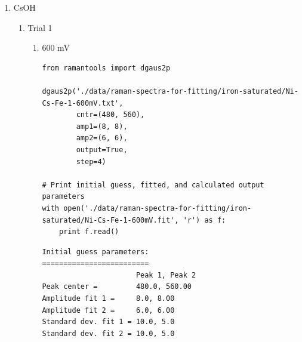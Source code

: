 \documentclass[journal=jpccck,manuscript=suppinfo,email=true]{achemso}
\begin{document}
\begin{enumerate}
\begin{enumerate}
\begin{enumerate}
\begin{verbatim}
# Print initial guess, fitted, and calculated output parameters
with open('./data/raman-spectra-for-fitting/iron-saturated/Ni-Li-Fe-3-800mV.fit', 'r') as f:
    print f.read()
\end{verbatim}

\begin{verbatim}
Initial guess parameters:
=========================
                      Peak 1, Peak 2
Peak center =         480.0, 560.00
Amplitude fit 1 =     12.0, 12.00
Amplitude fit 2 =     7.0, 7.00
Standard dev. fit 1 = 10.0, 5.0
Standard dev. fit 2 = 10.0, 5.0

Baseline parameters:
=========================
Slope =               -0.01
Intercept =           24.05

Fitted parameters:
=========================
                      Peak 1, Peak 2
Peak center =         479.58, 558.77
Amplitude fit 1 =     5.40, 11.84
Amplitude fit 2 =     4.66, 4.46
Standard dev. fit 1 = 38.02, 8.16
Standard dev. fit 2 = 29.19, 8.02

Calculation output:
========================
Mean peak 1 =         479.6 $\pm$ 0.41
Mean peak 2 =         558.8 $\pm$ 0.96
Height peak 1 =       34.8 $\pm$ 0.42
Height peak 2 =       25.6 $\pm$ 0.42
Area peak 1 =         1071.0
Area peak 2 =         608.7
\end{verbatim}
\end{enumerate}
\end{enumerate}

\item CsOH
\label{sec-4-2-0-2}
\begin{enumerate}
\item Trial 1
\label{sec-4-2-0-2-1}
\begin{enumerate}
\item 600 mV
\label{sec-4-2-0-2-1-1}
\begin{verbatim}
from ramantools import dgaus2p

dgaus2p('./data/raman-spectra-for-fitting/iron-saturated/Ni-Cs-Fe-1-600mV.txt',
        cntr=(480, 560),
        amp1=(8, 8),
        amp2=(6, 6),
        output=True,
        step=4)

# Print initial guess, fitted, and calculated output parameters
with open('./data/raman-spectra-for-fitting/iron-saturated/Ni-Cs-Fe-1-600mV.fit', 'r') as f:
    print f.read()
\end{verbatim}

\begin{verbatim}
Initial guess parameters:
=========================
                      Peak 1, Peak 2
Peak center =         480.0, 560.00
Amplitude fit 1 =     8.0, 8.00
Amplitude fit 2 =     6.0, 6.00
Standard dev. fit 1 = 10.0, 5.0
Standard dev. fit 2 = 10.0, 5.0


\end{verbatim}
\end{enumerate}
\end{enumerate}
\end{enumerate}
\end{document}
